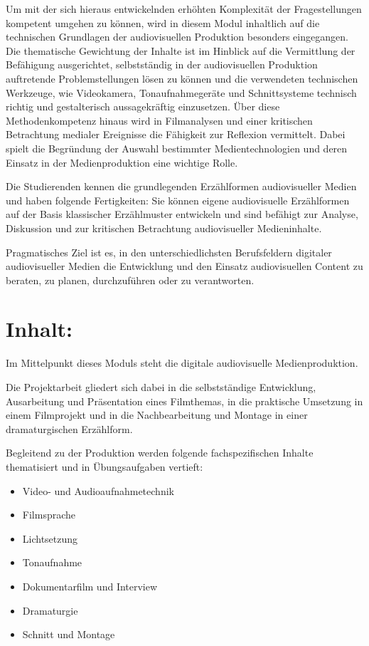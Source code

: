 Um mit der sich hieraus entwickelnden erhöhten Komplexität der
Fragestellungen kompetent umgehen zu können, wird in diesem Modul
inhaltlich auf die technischen Grundlagen der audiovisuellen Produktion
besonders eingegangen. Die thematische Gewichtung der Inhalte ist im
Hinblick auf die Vermittlung der Befähigung ausgerichtet, selbstständig
in der audiovisuellen Produktion auftretende Problemstellungen lösen zu
können und die verwendeten technischen Werkzeuge, wie Videokamera,
Tonaufnahmegeräte und Schnittsysteme technisch richtig und gestalterisch
aussagekräftig einzusetzen. Über diese Methodenkompetenz hinaus wird in
Filmanalysen und einer kritischen Betrachtung medialer Ereignisse die
Fähigkeit zur Reflexion vermittelt. Dabei spielt die Begründung der
Auswahl bestimmter Medientechnologien und deren Einsatz in der
Medienproduktion eine wichtige Rolle.

Die Studierenden kennen die grundlegenden Erzählformen audiovisueller
Medien und haben folgende Fertigkeiten: Sie können eigene audiovisuelle
Erzählformen auf der Basis klassischer Erzählmuster entwickeln und sind
befähigt zur Analyse, Diskussion und zur kritischen Betrachtung
audiovisueller Medieninhalte.

Pragmatisches Ziel ist es, in den unterschiedlichsten Berufsfeldern
digitaler audiovisueller Medien die Entwicklung und den Einsatz
audiovisuellen Content zu beraten, zu planen, durchzuführen oder zu
verantworten.

\section*{Inhalt:}\label{inhalt-2}

Im Mittelpunkt dieses Moduls steht die digitale audiovisuelle
Medienproduktion.

Die Projektarbeit gliedert sich dabei in die selbstständige Entwicklung,
Ausarbeitung und Präsentation eines Filmthemas, in die praktische
Umsetzung in einem Filmprojekt und in die Nachbearbeitung und Montage in
einer dramaturgischen Erzählform.

Begleitend zu der Produktion werden folgende fachspezifischen Inhalte
thematisiert und in Übungsaufgaben vertieft:

\begin{itemize}
\tightlist
\item
  Video- und Audioaufnahmetechnik
\item
  Filmsprache
\item
  Lichtsetzung
\item
  Tonaufnahme
\item
  Dokumentarfilm und Interview
\item
  Dramaturgie
\item
  Schnitt und Montage
\end{itemize}

